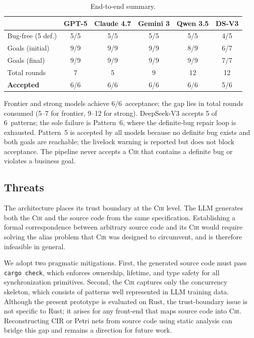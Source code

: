 \documentclass[sigconf]{acmart}
\begin{document}
\begin{table}[t]
\caption{End-to-end summary.}
\label{tab:summary}
\centering\footnotesize
\begin{tabular}{@{}l ccccc@{}}
\toprule
& \textbf{GPT-5} & \textbf{Claude 4.7}
  & \textbf{Gemini 3}
  & \textbf{Qwen 3.5} & \textbf{DS-V3} \\
\midrule
Bug-free (5 def.)
             & 5/5 & 5/5 & 5/5 & 5/5 & 4/5 \\
Goals (initial)
             & 9/9 & 9/9 & 9/9 & 8/9 & 6/7 \\
Goals (final)
             & 9/9 & 9/9 & 9/9 & 9/9 & 7/7 \\
Total rounds & 7   & 5   & 9   & 12  & 12  \\
\midrule
\textbf{Accepted}
             & 6/6 & 6/6 & 6/6 & 6/6 & 5/6 \\
\bottomrule
\end{tabular}
\end{table}

Frontier and strong models achieve 6/6~acceptance; the gap lies in total rounds consumed (5--7 for frontier, 9--12 for strong). DeepSeek-V3 accepts 5 of 6~patterns; the sole failure is Pattern~6, where the definite-bug repair loop is exhausted. Pattern~5 is accepted by all models because no definite bug exists and both goals are reachable; the livelock warning is reported but does not block acceptance. The pipeline never accepts a \textsc{Cir} that contains a definite bug or violates a business goal.


\subsection{Threats}
\label{subsec:trust-boundary}

The architecture places its trust boundary at the \textsc{Cir} level. The LLM generates both the \textsc{Cir} and the source code from the same specification. Establishing a formal correspondence between arbitrary source
code and its \textsc{Cir} would require solving the alias problem that \textsc{Cir} was designed to circumvent, and is therefore infeasible in general.

We adopt two pragmatic mitigations. First, the generated source code must pass \texttt{cargo check}, which enforces ownership, lifetime, and type safety for all synchronization primitives. Second, the \textsc{Cir} captures only the concurrency skeleton, which consists of patterns well represented in LLM training data. Although the present prototype is evaluated on Rust, the trust-boundary issue is not specific to Rust; it arises for any front-end that maps source code into \textsc{Cir}. Reconstructing CIR or Petri nets from source code using static analysis can bridge this gap and remains a direction for future work.
\end{document}
